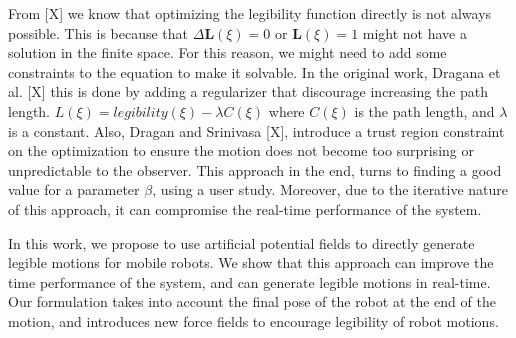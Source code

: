     From [X] we know that optimizing the legibility function directly is not always possible.
    This is because that $\Delta \mathbf{L}(\xi) = 0$ or $\mathbf{L}(\xi) = 1$ might not have a solution in the finite space.
    For this reason, we might need to add some constraints to the equation to make it solvable.
    In the original work, Dragana et al. [X] this is done by adding a regularizer that discourage increasing the path length.
    $L(\xi) = legibility(\xi) - \lambda C(\xi)$
    where $C(\xi)$ is the path length, and $\lambda$ is a constant.
    Also, Dragan and Srinivasa [X], introduce a trust region constraint on the optimization
     to ensure the motion does not become too surprising or unpredictable to the observer.
    This approach in the end, turns to finding a good value for a parameter $\beta$, using a user study.
    Moreover, due to the iterative nature of this approach, it can compromise the real-time performance of the system.

    In this work, we propose to use artificial potential fields to directly generate legible motions for mobile robots.
    We show that this approach can improve the time performance of the system, and can generate legible motions in real-time.
    Our formulation takes into account the final pose of the robot at the end of the motion,
    and introduces new force fields to encourage legibility of robot motions.



%


